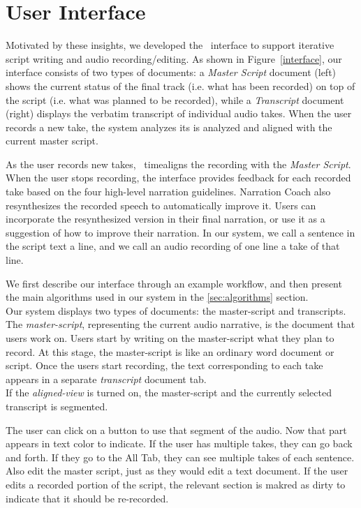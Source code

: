 \section{User Interface}
Motivated by these insights, we developed the \systemname\  interface to support iterative script writing and  audio recording/editing. As shown in Figure~\ref{interface}, our interface
consists of two types of documents: a \textit{Master Script} document (left) shows the current status of the final track (i.e. what has been recorded) on top of the script (i.e. what was planned to be recorded), while a \textit{Transcript} document (right) displays the verbatim transcript of individual audio takes. When the user records a new take, the system analyzes its  is analyzed and aligned with the current master script. 

As the user records new takes, \systemname\ timealigns
the recording with the \textit {Master Script}. 
 When the
user stops recording, the interface provides feedback for
each recorded take based on the four high-level narration
guidelines. Narration Coach also resynthesizes the recorded
speech to automatically improve it. Users can incorporate the
resynthesized version in their final narration, or use it as a
suggestion of how to improve their narration. In our system,
we call a sentence in the script text a line, and we call an
audio recording of one line a take of that line.

We first describe our interface through an example workflow, and then present the main algorithms used in our system in the \ref{sec:algorithms} section.\\
 Our system displays two types of documents: the master-script and transcripts. The \textit{master-script}, representing the current audio narrative, is the document that users work on. Users start by writing on the master-script what they plan to
record. At this stage, the master-script is like an ordinary
word document or script. Once the users start recording, the text corresponding to each take appears in a separate \textit{transcript} document tab.\\
If the \textit{aligned-view} is turned on, the master-script and the currently selected transcript is segmented.

The user can click on a button to use that segment of the audio. Now that part appears in text color to indicate. If the user has multiple takes, they can go back and forth. If they go to the All Tab, they can see multiple takes of each sentence.
Also edit the master script, just as they would edit a text document. If the user edits a recorded portion of the script, the relevant section is makred as dirty to indicate that it should be re-recorded.

